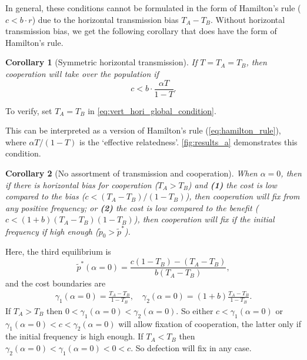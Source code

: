\documentclass[12pt]{extarticle}
\newtheorem{corollary}{Corollary}
\begin{document}
{In general, these conditions cannot be formulated in the form of Hamilton's rule ($c<b\cdot r$) due to the horizontal transmission bias $T_A-T_B$.
Without horizontal transmission bias, we get the following corollary that does have the form of Hamilton's rule.\\

\begin{corollary}[Symmetric horizontal transmission]
If $T=T_A=T_B$, then cooperation will take over the population if
\begin{equation}
\label{eq:equal_transmission}
c < b \cdot \frac{\alpha T}{1-T}.
\end{equation}
\end{corollary}
To verify, set $T_A=T_B$ in \autoref{eq:vert_hori_global_condition}.

This can be interpreted as a version of Hamilton's rule (\autoref{eq:hamilton_rule}), where $\alpha T/(1-T)$ is the `effective relatedness'.
\autoref{fig:results_a} demonstrates this condition. 
\\

\begin{corollary}[No assortment of transmission and cooperation]
When $\alpha=0$, then if there is horizontal bias for cooperation ($T_A>T_B$) and
\textbf{(1)} the cost is low compared to the bias ($c<(T_A-T_B)/(1-T_B)$), then cooperation will fix from any positive frequency; or
\textbf{(2)} the cost is low compared to the benefit ($c<(1+b)(T_A-T_B)(1-T_B)$), then cooperation will fix if the initial frequency if high enough ($\tilde{p}_0 > \tilde{p}^*$).
\end{corollary}

Here, the third equilibrium is
\begin{equation} \label{eq:vert_hori_alpha0_equilibrium}
\tilde{p}^*(\alpha=0) = \frac{c(1-T_B) - (T_A-T_B)}{b (T_A-T_B) },
\end{equation} 
and the cost boundaries are
\begin{equation}\begin{aligned}
\gamma_1(\alpha=0) = \frac{T_A - T_B}{1-T_B}, \quad
\gamma_2(\alpha=0) = (1+b)\frac{T_A - T_B}{1-T_B}.
\end{aligned}\end{equation}
If $T_A>T_B$ then $0<\gamma_1(\alpha=0)<\gamma_2(\alpha=0)$.
So either $c<\gamma_1(\alpha=0)$ or $\gamma_1(\alpha=0)<c<\gamma_2(\alpha=0)$ will allow fixation of cooperation, the latter only if the initial frequency is high enough.
If $T_A<T_B$ then $\gamma_2(\alpha=0)<\gamma_1(\alpha=0)<0<c$.
So defection will fix in any case.
\\

}
\end{document}
